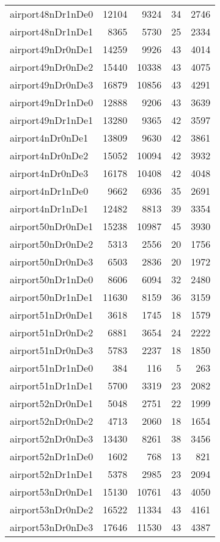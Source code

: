 \begin{tabular}{lrrrr}
airport48nDr1nDe0 & 12104 & 9324 & 34 & 2746 \\
airport48nDr1nDe1 & 8365 & 5730 & 25 & 2334 \\
airport49nDr0nDe1 & 14259 & 9926 & 43 & 4014 \\
airport49nDr0nDe2 & 15440 & 10338 & 43 & 4075 \\
airport49nDr0nDe3 & 16879 & 10856 & 43 & 4291 \\
airport49nDr1nDe0 & 12888 & 9206 & 43 & 3639 \\
airport49nDr1nDe1 & 13280 & 9365 & 42 & 3597 \\
airport4nDr0nDe1 & 13809 & 9630 & 42 & 3861 \\
airport4nDr0nDe2 & 15052 & 10094 & 42 & 3932 \\
airport4nDr0nDe3 & 16178 & 10408 & 42 & 4048 \\
airport4nDr1nDe0 & 9662 & 6936 & 35 & 2691 \\
airport4nDr1nDe1 & 12482 & 8813 & 39 & 3354 \\
airport50nDr0nDe1 & 15238 & 10987 & 45 & 3930 \\
airport50nDr0nDe2 & 5313 & 2556 & 20 & 1756 \\
airport50nDr0nDe3 & 6503 & 2836 & 20 & 1972 \\
airport50nDr1nDe0 & 8606 & 6094 & 32 & 2480 \\
airport50nDr1nDe1 & 11630 & 8159 & 36 & 3159 \\
airport51nDr0nDe1 & 3618 & 1745 & 18 & 1579 \\
airport51nDr0nDe2 & 6881 & 3654 & 24 & 2222 \\
airport51nDr0nDe3 & 5783 & 2237 & 18 & 1850 \\
airport51nDr1nDe0 & 384 & 116 & 5 & 263 \\
airport51nDr1nDe1 & 5700 & 3319 & 23 & 2082 \\
airport52nDr0nDe1 & 5048 & 2751 & 22 & 1999 \\
airport52nDr0nDe2 & 4713 & 2060 & 18 & 1654 \\
airport52nDr0nDe3 & 13430 & 8261 & 38 & 3456 \\
airport52nDr1nDe0 & 1602 & 768 & 13 & 821 \\
airport52nDr1nDe1 & 5378 & 2985 & 23 & 2094 \\
airport53nDr0nDe1 & 15130 & 10761 & 43 & 4050 \\
airport53nDr0nDe2 & 16522 & 11334 & 43 & 4161 \\
airport53nDr0nDe3 & 17646 & 11530 & 43 & 4387 \\

\end{tabular}

